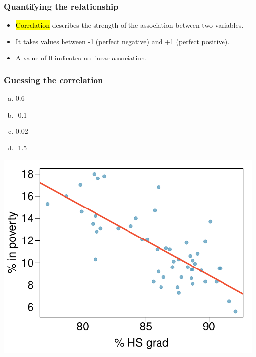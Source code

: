 
\begin{frame}
\frametitle{Quantifying the relationship}

\begin{itemize}

\item \hl{Correlation} describes the strength of the  association between two variables.

\pause

\item It takes values between -1 (perfect negative) and +1 (perfect positive).

\pause

\item A value of 0 indicates no linear association.

\end{itemize}

\end{frame}


\begin{frame}
\frametitle{Guessing the correlation}

{
\begin{enumerate}[(a)]
\item 0.6
\item -0.1
\item 0.02
\item -1.5
\end{enumerate}
}
{
\begin{center}
\includegraphics[width=\textwidth]{7-1_linefit_res_corr/figures/poverty/poverty_hsgrad_line}
\end{center}
}

\end{frame}

